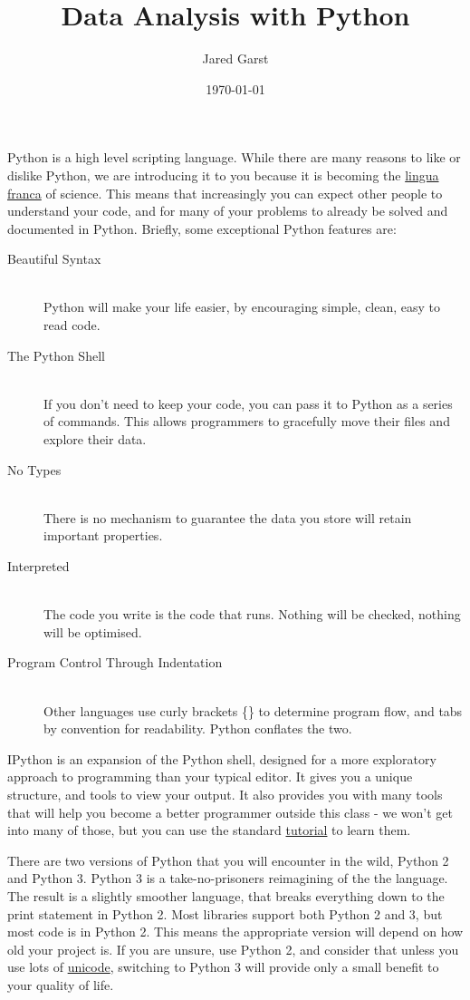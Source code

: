 \documentclass[justified]{tufte-handout}
\title{Data Analysis with Python}
\author{Jared Garst}
\date{\today} %
\newcommand{\aboutUnicodeLink}
  {http://www.joelonsoftware.com/articles/Unicode.html}
\newcommand{\ipythonTutorialLink}
  {http://ipython.org/ipython-doc/stable/interactive/tutorial.html}
\newcommand{\linguaFrancaLink}{http://en.wikipedia.org/wiki/Lingua_franca}
\begin{document}
\maketitle
\bigskip

\noindent
Python is a high level scripting language. While there are many reasons to like
or dislike Python, we are introducing it to you because it is becoming the
\href{\linguaFrancaLink}{lingua franca} of
science. This means that increasingly you can expect other people to understand
your code, and for many of your problems to already be solved and documented in
Python. Briefly, some exceptional Python features are:

\begin{description}
\item[Beautiful Syntax] \hfill \\
  Python will make your life easier, by encouraging simple, clean, easy to read
  code.
\item[The Python Shell] \hfill \\
  If you don't need to keep your code, you can pass it to Python as a series of
  commands. This allows programmers to gracefully move their files and explore
  their data.
\item[No Types] \hfill \\
  There is no mechanism to guarantee the data you store will retain important
  properties.
\item[Interpreted] \hfill \\
  The code you write is the code that runs. Nothing will be checked, nothing
  will be optimised.
\item[Program Control Through Indentation] \hfill \\
  Other languages use curly brackets \{\} to determine program flow, and tabs by
  convention for readability. Python conflates the two.
\end{description}

\noindent
IPython is an expansion of the Python shell, designed for a more exploratory
approach to programming than your typical editor. It gives you a unique
structure, and tools to view your output. It also provides you with many tools
that will help you become a better programmer outside this class - we won't get
into many of those, but you can use the standard
\href{\ipythonTutorialLink}{tutorial} to learn them.

\smallskip
\noindent
There are two versions of Python that you will encounter in the wild, Python 2
and Python 3. Python 3 is a take-no-prisoners reimagining of the the
language. The result is a slightly smoother language, that breaks everything
down to the print statement in Python 2. Most libraries support both Python 2
and 3, but most code is in Python 2. This means the appropriate version will
depend on how old your project is. If you are unsure, use Python 2, and consider
that unless you use lots of
\href{\aboutUnicodeLink}{unicode}, switching
to Python 3 will provide only a small benefit to your quality of life.
\end{document}
